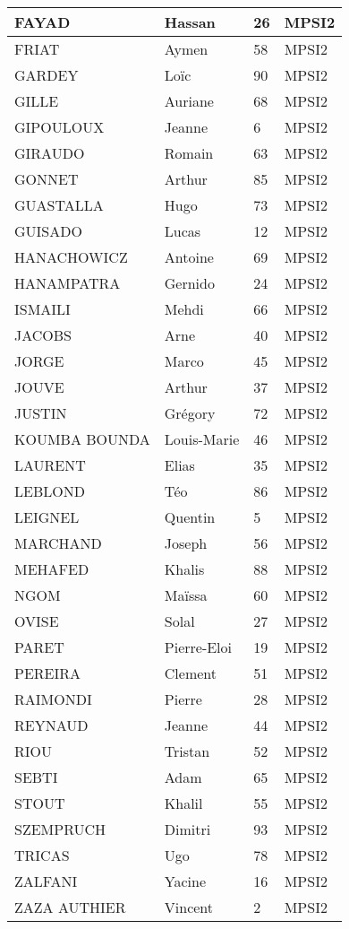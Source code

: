 \documentclass[francais,a4paper,div=19,12 pt]{scrartcl}
\begin{document}
\begin{center}
\begin{longtable}{|p{}|p{}|p{}|p{}|}
\hline
FAYAD & Hassan & 26 & MPSI2\\
\hline
FRIAT  & Aymen & 58 & MPSI2\\
\hline
GARDEY & Loïc & 90 & MPSI2\\
\hline
GILLE  & Auriane & 68 & MPSI2\\
\hline
GIPOULOUX  & Jeanne & 6 & MPSI2\\
\hline
GIRAUDO  & Romain & 63 & MPSI2\\
\hline
GONNET  & Arthur & 85 & MPSI2\\
\hline
GUASTALLA  & Hugo & 73 & MPSI2\\
\hline
GUISADO  & Lucas & 12 & MPSI2\\
\hline
HANACHOWICZ  & Antoine & 69 & MPSI2\\
\hline
HANAMPATRA  & Gernido & 24 & MPSI2\\
\hline
ISMAILI  & Mehdi & 66 & MPSI2\\
\hline
JACOBS  & Arne & 40 & MPSI2\\
\hline
JORGE  & Marco & 45 & MPSI2\\
\hline
JOUVE  & Arthur & 37 & MPSI2\\
\hline
JUSTIN  & Grégory & 72 & MPSI2\\
\hline
KOUMBA BOUNDA  & Louis-Marie & 46 & MPSI2\\
\hline
LAURENT  & Elias & 35 & MPSI2\\
\hline
LEBLOND  & Téo & 86 & MPSI2\\
\hline
LEIGNEL  & Quentin & 5 & MPSI2\\
\hline
MARCHAND  & Joseph & 56 & MPSI2\\
\hline
MEHAFED  & Khalis & 88 & MPSI2\\
\hline
NGOM & Maïssa & 60 & MPSI2\\
\hline
OVISE  & Solal & 27 & MPSI2\\
\hline
PARET  & Pierre-Eloi & 19 & MPSI2\\
\hline
PEREIRA  & Clement & 51 & MPSI2\\
\hline
RAIMONDI  & Pierre & 28 & MPSI2\\
\hline
REYNAUD  & Jeanne & 44 & MPSI2\\
\hline
RIOU  & Tristan & 52 & MPSI2\\
\hline
SEBTI  & Adam & 65 & MPSI2\\
\hline
STOUT  & Khalil & 55 & MPSI2\\
\hline
SZEMPRUCH  & Dimitri & 93 & MPSI2\\
\hline
TRICAS  & Ugo & 78 & MPSI2\\
\hline
ZALFANI  & Yacine & 16 & MPSI2\\
\hline
ZAZA AUTHIER  & Vincent & 2 & MPSI2\\
\hline
\end{longtable}
\end{center}
\end{document}
